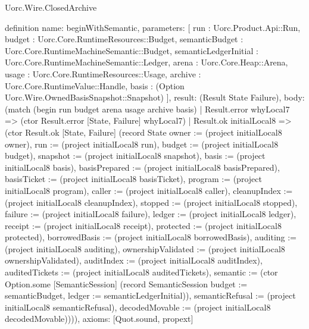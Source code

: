 \begin{lexlean}{Uorc.Wire.ClosedArchive}
\begin{semanticmodule}
definition{
  name: beginWithSemantic,
  parameters: [
    run : Uorc.Product.Api::Run,
    budget : Uorc.Core.RuntimeResources::Budget,
    semanticBudget : Uorc.Core.RuntimeMachineSemantic::Budget,
    semanticLedgerInitial : Uorc.Core.RuntimeMachineSemantic::Ledger,
    arena : Uorc.Core.Heap::Arena,
    usage : Uorc.Core.RuntimeResources::Usage,
    archive : Uorc.Core.RuntimeValue::Handle,
    basis : (Option Uorc.Wire.OwnedBasisSnapshot::Snapshot)
  ],
  result: (Result State Failure),
  body: (match (begin run budget arena usage archive basis)
    | Result.error whyLocal7 => (ctor Result.error [State, Failure] whyLocal7)
    | Result.ok initialLocal8 => (ctor Result.ok [State, Failure] (record State {owner := (project initialLocal8 owner), run := (project initialLocal8 run), budget := (project initialLocal8 budget), snapshot := (project initialLocal8 snapshot), basis := (project initialLocal8 basis), basisPrepared := (project initialLocal8 basisPrepared), basisTicket := (project initialLocal8 basisTicket), program := (project initialLocal8 program), caller := (project initialLocal8 caller), cleanupIndex := (project initialLocal8 cleanupIndex), stopped := (project initialLocal8 stopped), failure := (project initialLocal8 failure), ledger := (project initialLocal8 ledger), receipt := (project initialLocal8 receipt), protected := (project initialLocal8 protected), borrowedBasis := (project initialLocal8 borrowedBasis), auditing := (project initialLocal8 auditing), ownershipValidated := (project initialLocal8 ownershipValidated), auditIndex := (project initialLocal8 auditIndex), auditedTickets := (project initialLocal8 auditedTickets), semantic := (ctor Option.some [SemanticSession] (record SemanticSession {budget := semanticBudget, ledger := semanticLedgerInitial})), semanticRefusal := (project initialLocal8 semanticRefusal), decodedMovable := (project initialLocal8 decodedMovable)}))),
  axioms: [Quot.sound, propext]
}


\end{semanticmodule}
\end{lexlean}

